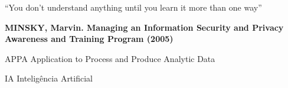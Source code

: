 \documentclass[12pt,oneside,a4paper,chapter=TITLE, english, french,	spanish, brazil]{abntex2-logatti}
\begin{document}
\begin{epigrafe}
“You don't understand anything until you learn it more than one way”

\textbf{MINSKY, Marvin. Managing an Information Security and Privacy Awareness and Training
Program (2005)}
\end{epigrafe}



\setlength{\absparsep}{18pt} %







\listoffigures*
\cleardoublepage






\begin{siglas}
  \item[APPA] Application to Process and Produce Analytic Data
  \item[IA] Inteligência Artificial
\end{siglas}
\end{document}
